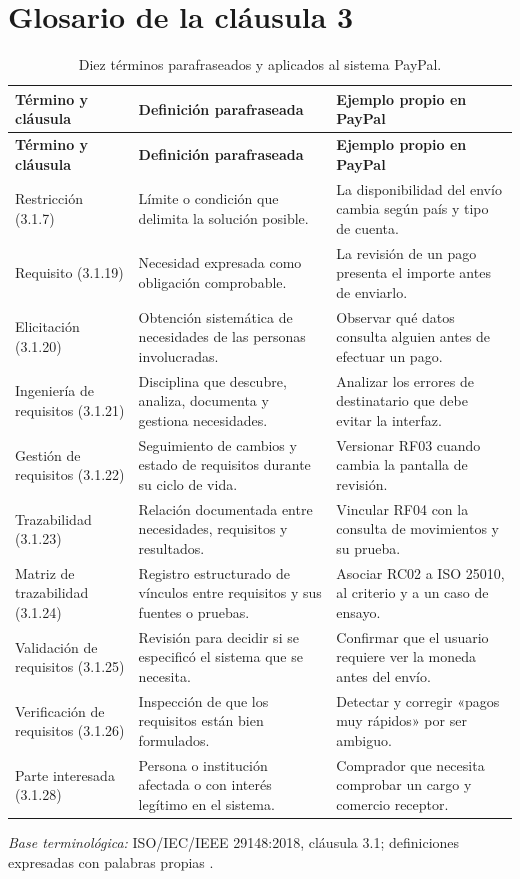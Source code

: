 \documentclass[10pt,a4paper]{extarticle}
\begin{document}
\section{Glosario de la cláusula 3}
\begin{longtable}{@{}p{2.9cm}p{5.9cm}p{7.65cm}@{}}
\caption{Diez términos parafraseados y aplicados al sistema PayPal.}\label{tab:glosario}\\
\toprule\textbf{Término y cláusula}&\textbf{Definición parafraseada}&\textbf{Ejemplo propio en PayPal}\\\midrule\endfirsthead
\toprule\textbf{Término y cláusula}&\textbf{Definición parafraseada}&\textbf{Ejemplo propio en PayPal}\\\midrule\endhead
Restricción (3.1.7)&Límite o condición que delimita la solución posible.&La disponibilidad del envío cambia según país y tipo de cuenta.\\
Requisito (3.1.19)&Necesidad expresada como obligación comprobable.&La revisión de un pago presenta el importe antes de enviarlo.\\
Elicitación (3.1.20)&Obtención sistemática de necesidades de las personas involucradas.&Observar qué datos consulta alguien antes de efectuar un pago.\\
Ingeniería de requisitos (3.1.21)&Disciplina que descubre, analiza, documenta y gestiona necesidades.&Analizar los errores de destinatario que debe evitar la interfaz.\\
Gestión de requisitos (3.1.22)&Seguimiento de cambios y estado de requisitos durante su ciclo de vida.&Versionar RF03 cuando cambia la pantalla de revisión.\\
Trazabilidad (3.1.23)&Relación documentada entre necesidades, requisitos y resultados.&Vincular RF04 con la consulta de movimientos y su prueba.\\
Matriz de trazabilidad (3.1.24)&Registro estructurado de vínculos entre requisitos y sus fuentes o pruebas.&Asociar RC02 a ISO 25010, al criterio y a un caso de ensayo.\\
Validación de requisitos (3.1.25)&Revisión para decidir si se especificó el sistema que se necesita.&Confirmar que el usuario requiere ver la moneda antes del envío.\\
Verificación de requisitos (3.1.26)&Inspección de que los requisitos están bien formulados.&Detectar y corregir «pagos muy rápidos» por ser ambiguo.\\
Parte interesada (3.1.28)&Persona o institución afectada o con interés legítimo en el sistema.&Comprador que necesita comprobar un cargo y comercio receptor.\\
\bottomrule
\end{longtable}
\noindent\footnotesize \textit{Base terminológica:} ISO/IEC/IEEE 29148:2018, cláusula 3.1; definiciones expresadas con palabras propias \cite{iso29148}.\normalsize
\end{document}
